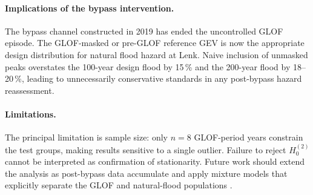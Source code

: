 \paragraph{Implications of the bypass intervention.}
The bypass channel constructed in 2019 \citep{GeoTest2019} has ended the uncontrolled
GLOF episode. The GLOF-masked or pre-GLOF reference GEV is now the appropriate design
distribution for natural flood hazard at Lenk. Naive inclusion of unmasked peaks
overstates the 100-year design flood by 15\,\% and the 200-year flood by 18--20\,\%,
leading to unnecessarily conservative standards in any post-bypass hazard reassessment.

\paragraph{Limitations.}
The principal limitation is sample size: only $n = 8$ GLOF-period years constrain the
test groups, making results sensitive to a single outlier. Failure to reject $H_0^{(2)}$
cannot be interpreted as confirmation of stationarity. Future work should extend the
analysis as post-bypass data accumulate and apply mixture models that explicitly separate
the GLOF and natural-flood populations \citep{Kite1977}.
